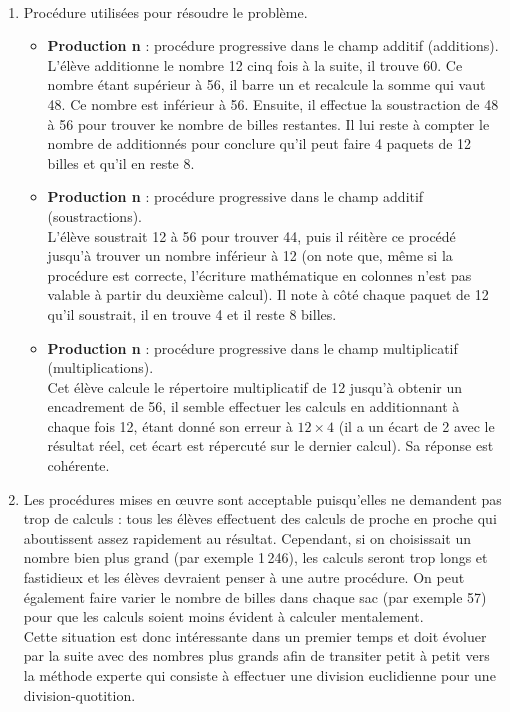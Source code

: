 \ \\ [-5mm]
\begin{enumerate}
   \item Procédure utilisées pour résoudre le problème.
   \begin{itemize}
      \item {\bf Production n} : procédure progressive dans le champ additif (additions). \\
      L'élève additionne le nombre 12 cinq fois à la suite, il trouve 60. Ce nombre étant supérieur à 56, il barre un  \fg{} et recalcule la somme qui vaut 48. Ce nombre est inférieur à 56. Ensuite, il effectue la soustraction de 48 à 56 pour trouver ke nombre de billes restantes. Il lui reste à compter le nombre de  \fg{} additionnés pour conclure qu'il peut faire 4 paquets de 12 billes et qu'il en reste 8.
      \item {\bf Production n} : procédure progressive dans le champ additif (soustractions). \\
      L'élève soustrait 12 à 56 pour trouver 44, puis il réitère ce procédé jusqu'à trouver un nombre inférieur à 12 (on note que, même si la procédure est correcte, l'écriture mathématique en colonnes n'est pas valable à partir du deuxième calcul). Il note à côté chaque paquet de 12 qu'il soustrait, il en trouve 4 et il reste 8 billes.
      \item {\bf Production n} : procédure progressive dans le champ multiplicatif (multiplications). \\
      Cet élève calcule le répertoire multiplicatif de 12 jusqu'à obtenir un encadrement de 56, il semble effectuer les calculs en additionnant à chaque fois 12, étant donné son erreur à $12\times4$ (il a un écart de 2 avec le résultat réel, cet écart est répercuté sur le dernier calcul). Sa réponse est cohérente.
   \end{itemize}
   \item Les procédures mises en \oe uvre sont acceptable puisqu'elles ne demandent pas trop de calculs : tous les élèves effectuent des calculs de proche en proche qui aboutissent assez rapidement au résultat. Cependant, si on choisissait un nombre bien plus grand (par exemple 1\,246), les calculs seront trop longs et fastidieux et les élèves devraient penser à une autre procédure. On peut également faire varier le nombre de billes dans chaque sac (par exemple 57) pour que les calculs soient moins évident à calculer mentalement. \\
   Cette situation est donc intéressante dans un premier temps et doit évoluer par la suite avec des nombres plus grands afin de transiter petit à petit vers la méthode experte qui consiste à effectuer une division euclidienne pour une division-quotition.

\end{enumerate}

